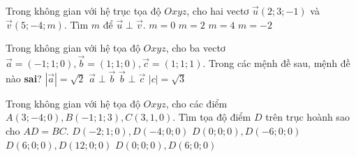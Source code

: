 \begin{ex}%
Trong không gian với hệ trục tọa độ $Oxyz$, cho hai vectơ $\overrightarrow{u}(2; 3;-1)$ và $\overrightarrow{v}(5;-4; m)$. Tìm $m$ để $\overrightarrow{u} \perp \overrightarrow{v}$.
	\choice
		{$m=0$}
		{$m=2$}
		{$m=4$}
		{\True $m=-2$}
\end{ex}
\begin{ex}%
Trong không gian với hệ tọa độ $Oxyz$, cho ba vectơ $\overrightarrow{a}=(-1; 1; 0), \overrightarrow{b}=(1; 1; 0), \overrightarrow{c}=(1; 1; 1)$. Trong các mệnh đề sau, mệnh đề nào \textbf{sai}?
	\choice
		{$|\overrightarrow{a}|=\sqrt{2}$}
		{$\overrightarrow{a} \perp \overrightarrow{b}$}
		{\True $\overrightarrow{b} \perp \overrightarrow{c}$}
		{$|c|=\sqrt{3}$}
\end{ex}
\begin{ex}%
Trong không gian với hệ tọa độ $Oxyz$, cho các điểm $A(3;-4; 0), B(-1; 1; 3), C(3,1,0)$. Tìm tọa độ điểm $D$ trên trục hoành sao cho $A D=BC$.
	\choice
		{$D(-2; 1; 0), D(-4; 0; 0)$ }
		{$D(0; 0; 0), D(-6; 0; 0)$ }
		{$D(6; 0; 0), D(12; 0; 0)$ }
		{\True $D(0; 0; 0), D(6; 0; 0)$}
\end{ex}

